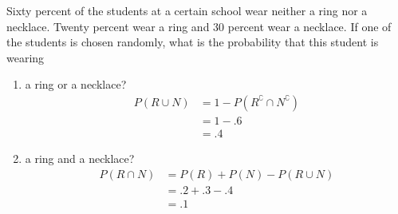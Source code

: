 \item Sixty percent of the students at a certain school wear neither a ring nor a necklace. Twenty percent wear a ring and 30 percent wear a necklace. If one of the students is chosen randomly, what is the probability that this student is wearing
\begin{enumerate}
    \item a ring or a necklace?
    \begin{align*}
        P(R\cup N)
        &= 1 - P(R^\complement \cap N^\complement )\\
        &= 1 - .6\\
        &= .4
    \end{align*}
    \item a ring and a necklace?
    \begin{align*}
        P(R\cap N)
        &= P(R) + P(N) - P(R \cup N)\\
        &= .2 + .3 - .4\\
        &= .1
    \end{align*}
\end{enumerate}